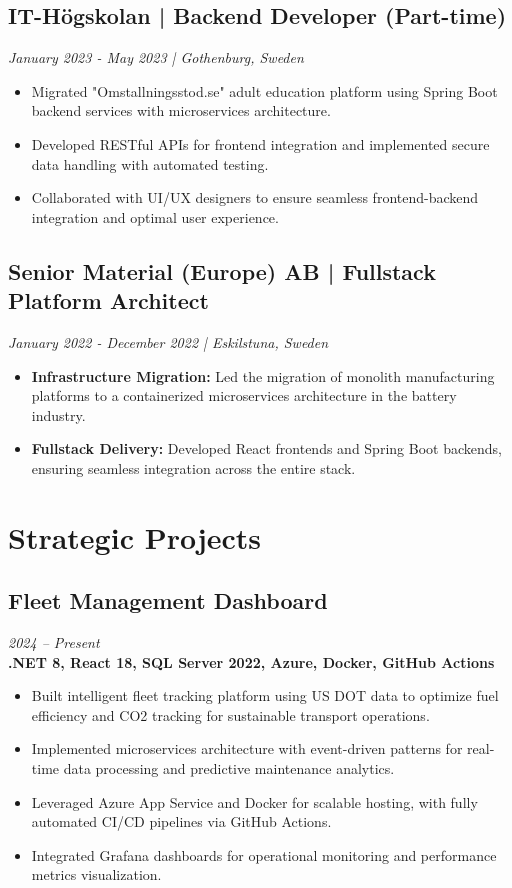 \documentclass[11pt,a4paper]{article}
\begin{document}
\subsection*{IT-Högskolan | Backend Developer (Part-time)}
\textit{January 2023 - May 2023 | Gothenburg, Sweden}
\begin{itemize}[noitemsep]
\item Migrated "Omstallningsstod.se" adult education platform using Spring Boot backend services with microservices architecture.
\item Developed RESTful APIs for frontend integration and implemented secure data handling with automated testing.
\item Collaborated with UI/UX designers to ensure seamless frontend-backend integration and optimal user experience.
\end{itemize}

\subsection*{Senior Material (Europe) AB | Fullstack Platform Architect}
\textit{January 2022 - December 2022 | Eskilstuna, Sweden}
\begin{itemize}[noitemsep]
\item \textbf{Infrastructure Migration:} Led the migration of monolith manufacturing platforms to a containerized microservices architecture in the battery industry.
\item \textbf{Fullstack Delivery:} Developed React frontends and Spring Boot backends, ensuring seamless integration across the entire stack.
\end{itemize}

\section*{Strategic Projects}

\subsection*{Fleet Management Dashboard}
\textit{2024 -- Present} \\
\textbf{.NET 8, React 18, SQL Server 2022, Azure, Docker, GitHub Actions}
\begin{itemize}[noitemsep]
\item Built intelligent fleet tracking platform using US DOT data to optimize fuel efficiency and CO2 tracking for sustainable transport operations.
\item Implemented microservices architecture with event-driven patterns for real-time data processing and predictive maintenance analytics.
\item Leveraged Azure App Service and Docker for scalable hosting, with fully automated CI/CD pipelines via GitHub Actions.
\item Integrated Grafana dashboards for operational monitoring and performance metrics visualization.
\end{itemize}
\end{document}
